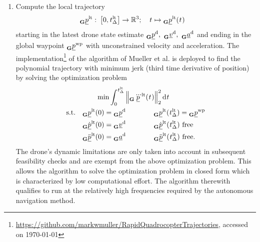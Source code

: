 \begin{enumerate}
    \item Compute the local trajectory 
    \begin{align} \label{eq:loc_traj}
        \pos[]{\loctraj}{}{\grs}{}
        :\ 
        &\left[0, \dur[]{\loctraj}{}{}{}\right] \rightarrow \mathbb{R}^3
        ;\quad
        \timepnt[]{}{}{}{}
        \mapsto
        \pos[]{\loctraj}{}{\grs}{}(\timepnt[]{}{}{}{})
    \end{align}
    starting in the latest drone state estimate
    $\pos[]{\drone}{}{\grs}{}
    ,\ 
    \vel[]{\drone}{}{\grs}{}
    ,\ 
    \acc[]{\drone}{}{\grs}{}$
    and ending in the global waypoint
    $\pos[]{\wayp}{}{\grs}{}$
    with unconstrained velocity and acceleration.
    The implementation\footnote{
            \url{https://github.com/markwmuller/RapidQuadrocopterTrajectories}, accessed on \today
    } 
    of the algorithm of Mueller et al. \cite{Mueller2013}
    is deployed to find the polynomial trajectory with minimum jerk
    (third time derivative of position)
    by solving the optimization problem
    \begin{align} \label{eq:loc_traj_opt_prob}
        &\qquad \min 
        \int_0^{\dur[]{\loctraj}{}{}{}}
            \left\|
                \pos[\dddot]{\loctraj}{}{\grs}{}(\timepnt[]{}{}{}{})
            \right\|^2_2
        \text d \timepnt[]{}{}{}{}
        \nonumber \\
        \text{s.t.}\quad
        & \pos[]{\loctraj}{}{\grs}{}(0) = \pos[]{\drone}{}{\grs}{}
        \qquad\qquad \pos[]{\loctraj}{}{\grs}{}(\dur[]{\loctraj}{}{}{}) = \pos[]{\wayp}{}{\grs}{}
        \nonumber \\
        & \pos[\dot]{\loctraj}{}{\grs}{}(0) = \vel[]{\drone}{}{\grs}{}
        \qquad\qquad \pos[\dot]{\loctraj}{}{\grs}{}(\dur[]{\loctraj}{}{}{}) \text{ free}
        \nonumber \\
        & \pos[\ddot]{\loctraj}{}{\grs}{}(0) = \acc[]{\drone}{}{\grs}{}
        \qquad\qquad \pos[\ddot]{\loctraj}{}{\grs}{}(\dur[]{\loctraj}{}{}{}) \text{ free}.
    \end{align}
    The drone's dynamic limitations
    are only taken into account in subsequent feasibility checks 
    and are exempt from the above optimization problem.
    This allows the algorithm to solve the optimization problem in closed form
    which is characterized by low computational effort.
    The algorithm therewith qualifies 
    to run at the relatively high frequencies
    required by the autonomous navigation method.
\end{enumerate}


